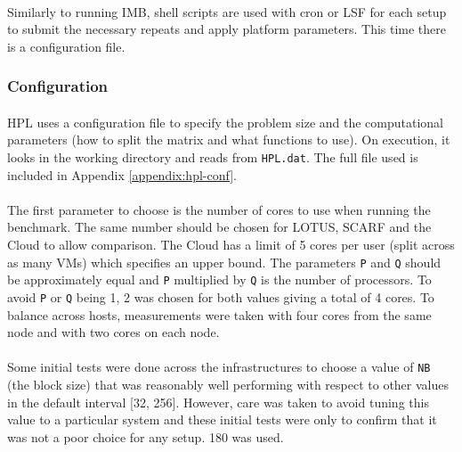\documentclass{article}
\begin{document}
        \paragraph{}
        Similarly to running IMB, shell scripts are used with cron or LSF for each setup to submit the necessary repeats and apply platform parameters. This time there is a configuration file.

        \subsubsection{Configuration}
            \paragraph{}
            HPL uses a configuration file to specify the problem size and the computational parameters (how to split the matrix and what functions to use). On execution, it looks in the working directory and reads from \verb|HPL.dat|. The full file used is included in Appendix \ref{appendix:hpl-conf}.


            \paragraph{}
            The first parameter to choose is the number of cores to use when running the benchmark. The same number should be chosen for LOTUS, SCARF and the Cloud to allow comparison. The Cloud has a limit of 5 cores per user (split across as many VMs) which specifies an upper bound. The parameters \verb|P| and \verb|Q| should be approximately equal and \verb|P| multiplied by \verb|Q| is the number of processors. To avoid \verb|P| or \verb|Q| being 1, 2 was chosen for both values giving a total of 4 cores. To balance across hosts, measurements were taken with four cores from the same node and with two cores on each node.

            \paragraph{}
            Some initial tests were done across the infrastructures to choose a value of \verb|NB| (the block size) that was reasonably well performing with respect to other values in the default interval [32, 256]. However, care was taken to avoid tuning this value to a particular system and these initial tests were only to confirm that it was not a poor choice for any setup. 180 was used.
\end{document}
